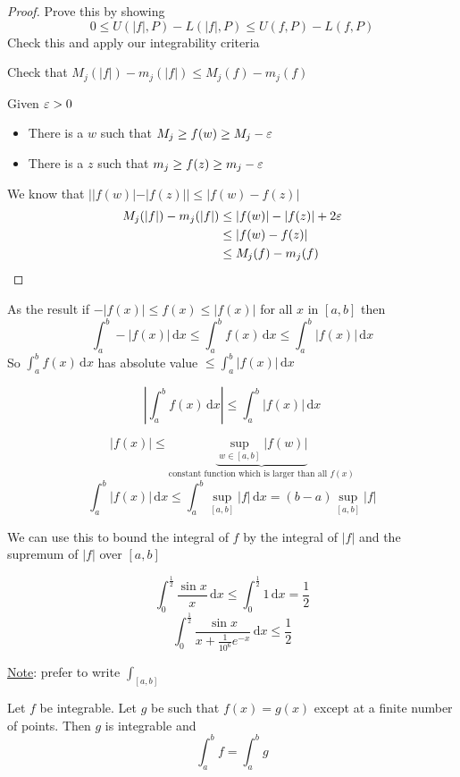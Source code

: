 \begin{proof}
  Prove this by showing
  \[0 \le U(|f|, P) - L(|f|, P) \le U(f, P) - L(f, P)\]
  Check this and apply our integrability criteria

  Check that $M_j(|f|) - m_j(|f|) \le M_j(f) - m_j(f)$

  Given $\varepsilon > 0$ 
  \begin{itemize}
    \item There is a $w$ such that $M_j \ge f(w) \ge M_j- \varepsilon$
    \item There is a $z$ such that $m_j \ge f(z) \ge m_j- \varepsilon$
  \end{itemize}
  We know that $||f(w)| - |f(z)|| \le |f(w) - f(z)|$
  \begin{align*}
  M_j(|f|) - m_j(|f|) &\le |f(w)| - |f(z)| + 2\varepsilon \\
  &\le |f(w) - f(z)| \\
  &\le M_j(f) - m_j(f) \\
  \end{align*}
\end{proof}

As the result if
$-|f(x)| \le f(x) \le |f(x)|$ for all $x$ in $[a, b]$ then 
\[\int_a^b -|f(x)| \,\mathrm{d}x \le \int_a^b f(x) \,\mathrm{d}x \le \int_a^b |f(x)| \,\mathrm{d}x\] 
So $\displaystyle\int_a^b f(x) \,\mathrm{d}x$ has absolute value $\displaystyle\le \int_a^b |f(x)| \,\mathrm{d}x$

\[\left|\int_a^b f(x) \,\mathrm{d}x\right|\le\int_a^b |f(x)|\,\mathrm{d}x\]

\[|f(x)| \le \underbrace{\sup_{w \in [a, b]} |f(w)|}_{\text{constant function which is larger than all }f(x)}\]
\[\int_a^b |f(x)| \,\mathrm{d}x \le \int_a^b \sup_{[a, b]}|f| \,\mathrm{d}x = (b-a) \sup_{[a, b]} |f| \]

We can use this to bound the integral of $f$ by the integral of $|f|$ and the supremum of $|f|$ over $[a, b]$

\begin{example*}
  \[\int_0^{\frac{1}{2}} \frac{\sin x}{x} \,\mathrm{d}x \le \int_0^{\frac{1}{2}} 1 \,\mathrm{d}x = \frac{1}{2} \]
  \[\int_0^{\frac{1}{2}} \frac{\sin x}{x + \frac{1}{10^6}e^{-x}} \,\mathrm{d}x \le \frac{1}{2} \]
\end{example*}

\underline{Note}: prefer to write $\displaystyle\int_{[a, b]}$

\begin{theorem*}[Exercise]
  Let $f$ be integrable. Let $g$ be such that $f(x) = g(x)$ except at a finite number of points. 
  Then $g$ is integrable and 
  \[\int_a^b f = \int_a^b g\]
\end{theorem*}

